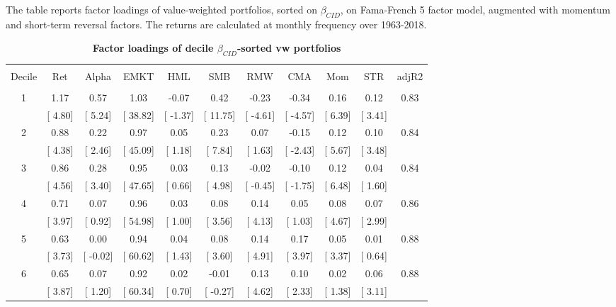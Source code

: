 \documentclass[12pt]{article}
\begin{document}
\begin{table}[!htbp] \centering 
  \caption{\textbf{Factor loadings of decile $\beta_{CID}$-sorted vw portfolios}} 
  \label{} 
  \begin{flushleft}
    {\medskip\small
 The table reports factor loadings of value-weighted portfolios, sorted on $\beta_{CID}$, on Fama-French 5 factor model, augmented with momentum and short-term reversal factors. The returns are calculated at monthly frequency over 1963-2018.}
    \medskip
    \end{flushleft}
\begin{tabular}{@{\extracolsep{0pt}} ccccccccccc} 
\\[-1.8ex]\hline 
\hline \\[-1.8ex] 
Decile & Ret & Alpha & EMKT & HML & SMB & RMW & CMA & Mom & STR & adjR2 \\ 
\hline \\[-1.8ex] 
1 & 1.17 & 0.57 & 1.03 & -0.07 & 0.42 & -0.23 & -0.34 & 0.16 & 0.12 & 0.83 \\ 
 & [ 4.80] & [ 5.24] & [ 38.82] & [ -1.37] & [ 11.75] & [ -4.61] & [ -4.57] & [ 6.39] & [ 3.41] &  \\ 
2 & 0.88 & 0.22 & 0.97 & 0.05 & 0.23 & 0.07 & -0.15 & 0.12 & 0.10 & 0.84 \\ 
 & [ 4.38] & [ 2.46] & [ 45.09] & [ 1.18] & [ 7.84] & [ 1.63] & [ -2.43] & [ 5.67] & [ 3.48] &  \\ 
3 & 0.86 & 0.28 & 0.95 & 0.03 & 0.13 & -0.02 & -0.10 & 0.12 & 0.04 & 0.84 \\ 
 & [ 4.56] & [ 3.40] & [ 47.65] & [ 0.66] & [ 4.98] & [ -0.45] & [ -1.75] & [ 6.48] & [ 1.60] &  \\ 
4 & 0.71 & 0.07 & 0.96 & 0.03 & 0.08 & 0.14 & 0.05 & 0.08 & 0.07 & 0.86 \\ 
 & [ 3.97] & [ 0.92] & [ 54.98] & [ 1.00] & [ 3.56] & [ 4.13] & [ 1.03] & [ 4.67] & [ 2.99] &  \\ 
5 & 0.63 & 0.00 & 0.94 & 0.04 & 0.08 & 0.14 & 0.17 & 0.05 & 0.01 & 0.88 \\ 
 & [ 3.73] & [ -0.02] & [ 60.62] & [ 1.43] & [ 3.60] & [ 4.91] & [ 3.97] & [ 3.37] & [ 0.64] &  \\ 
6 & 0.65 & 0.07 & 0.92 & 0.02 & -0.01 & 0.13 & 0.10 & 0.02 & 0.06 & 0.88 \\ 
 & [ 3.87] & [ 1.20] & [ 60.34] & [ 0.70] & [ -0.27] & [ 4.62] & [ 2.33] & [ 1.38] & [ 3.11] &  \\ 

\end{tabular}
\end{table}
\end{document}
